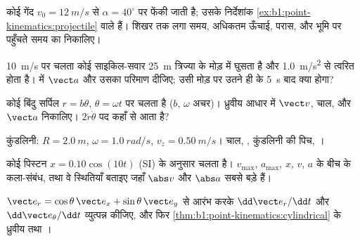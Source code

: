\begin{exercise}[$\star$]\label{exo:b1:point-kinematics:4}
कोई गेंद $v_0 = \qty{12}{m/s}$ से $\alpha = 40^\circ$ पर फेंकी जाती है; उसके
निर्देशांक \cref{ex:b1:point-kinematics:projectile} वाले हैं।
शिखर तक लगा समय, अधिकतम ऊँचाई, परास, और भूमि पर पहुँचते समय का  निकालिए।
\end{exercise}

\begin{exercise}[$\star\star$]\label{exo:b1:point-kinematics:5}
\qty{10}{m/s} पर चलता कोई साइकिल-सवार \qty{25}{m} त्रिज्या के मोड़ में घुसता
है और \qty{1.0}{m/s^2} से त्वरित होता है।  में $\vect a$ और उसका
परिमाण दीजिए; उसी मोड़ पर उतने ही  के \qty{5}{s} बाद क्या होगा?
\end{exercise}

\begin{exercise}[$\star\star$]\label{exo:b1:point-kinematics:6}
कोई बिंदु सर्पिल $r = b\theta$, $\theta = \omega t$ पर चलता है ($b$,
$\omega$ अचर)। ध्रुवीय आधार में $\vect v$, चाल, और $\vect a$ निकालिए।
$2\dot r\dot\theta$ पद कहाँ से आता है?
\end{exercise}

\begin{exercise}[$\star\star$]\label{exo:b1:point-kinematics:7}
कुंडलिनी: $R = \qty{2.0}{m}$, $\omega = \qty{1.0}{rad/s}$, $v_z = \qty{0.50}{m/s}$।
चाल, , कुंडलिनी की पिच, ।
\end{exercise}

\begin{exercise}[$\star\star$]\label{exo:b1:point-kinematics:8}
कोई पिस्टन $x = 0.10\cos(10t)$ (SI) के अनुसार चलता है। $v_{\max}$, $a_{\max}$,
$x$, $v$, $a$ के बीच के कला-संबंध, तथा वे स्थितियाँ बताइए जहाँ
$\abs v$ और $\abs a$ सबसे बड़े हैं।
\end{exercise}

\begin{exercise}[$\star\star$]\label{exo:b1:point-kinematics:9}
$\vect e_r = \cos\theta\,\vect e_x + \sin\theta\,\vect e_y$ से आरंभ करके
$\dd\vect e_r/\dd t$ और $\dd\vect e_\theta/\dd t$ व्युत्पन्न कीजिए, और फिर
\cref{thm:b1:point-kinematics:cylindrical} के ध्रुवीय  तथा ।
\end{exercise}

